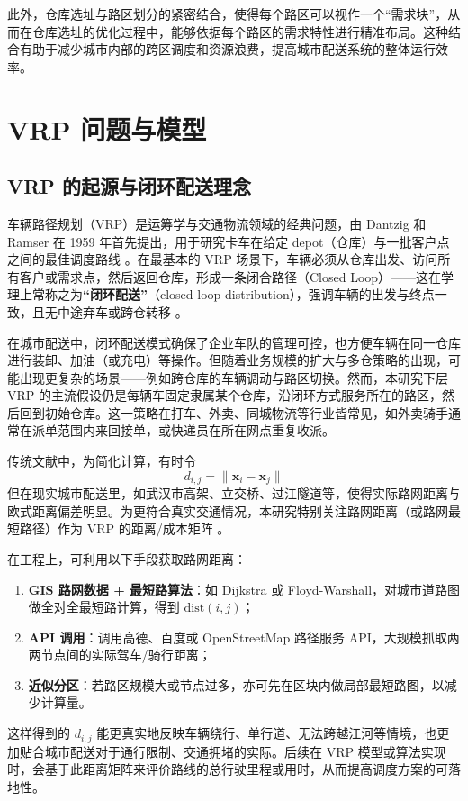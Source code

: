 \documentclass[12pt,a4paper,twoside]{ctexbook}
\begin{document}
此外，仓库选址与路区划分的紧密结合，使得每个路区可以视作一个“需求块”，从而在仓库选址的优化过程中，能够依据每个路区的需求特性进行精准布局。这种结合有助于减少城市内部的跨区调度和资源浪费，提高城市配送系统的整体运行效率。

\section{VRP 问题与模型}

\subsection{VRP 的起源与闭环配送理念}
车辆路径规划（VRP）是运筹学与交通物流领域的经典问题，由 Dantzig 和 Ramser 在 1959 年首先提出，用于研究卡车在给定 depot（仓库）与一批客户点之间的最佳调度路线 \cite{dantzig1959truck}。在最基本的 VRP 场景下，车辆必须从仓库出发、访问所有客户或需求点，然后返回仓库，形成一条闭合路径（Closed Loop）——这在学理上常称之为\textbf{“闭环配送”}（closed-loop distribution），强调车辆的出发与终点一致，且无中途弃车或跨仓转移 \cite{crainic2010fleet}。

在城市配送中，闭环配送模式确保了企业车队的管理可控，也方便车辆在同一仓库进行装卸、加油（或充电）等操作。但随着业务规模的扩大与多仓策略的出现，可能出现更复杂的场景——例如跨仓库的车辆调动与路区切换。然而，本研究下层 VRP 的主流假设仍是每辆车固定隶属某个仓库，沿闭环方式服务所在的路区，然后回到初始仓库。这一策略在打车、外卖、同城物流等行业皆常见，如外卖骑手通常在派单范围内来回接单，或快递员在所在网点重复收派。

传统文献中，为简化计算，有时令
\[
d_{i,j} = \|\mathbf{x}_i - \mathbf{x}_j\|
\]
但在现实城市配送里，如武汉市高架、立交桥、过江隧道等，使得实际路网距离与欧式距离偏差明显。为更符合真实交通情况，本研究特别关注路网距离（或路网最短路径）作为 VRP 的距离/成本矩阵 \cite{laporte2009fifty}。

在工程上，可利用以下手段获取路网距离：
\begin{enumerate}
    \item \textbf{GIS 路网数据 + 最短路算法}：如 Dijkstra 或 Floyd-Warshall，对城市道路图做全对全最短路计算，得到 $\mathrm{dist}(i,j)$；
    \item \textbf{API 调用}：调用高德、百度或 OpenStreetMap 路径服务 API，大规模抓取两两节点间的实际驾车/骑行距离；
    \item \textbf{近似分区}：若路区规模大或节点过多，亦可先在区块内做局部最短路图，以减少计算量。
\end{enumerate}

这样得到的 $d_{i,j}$ 能更真实地反映车辆绕行、单行道、无法跨越江河等情境，也更加贴合城市配送对于通行限制、交通拥堵的实际。后续在 VRP 模型或算法实现时，会基于此距离矩阵来评价路线的总行驶里程或用时，从而提高调度方案的可落地性。
\end{document}
